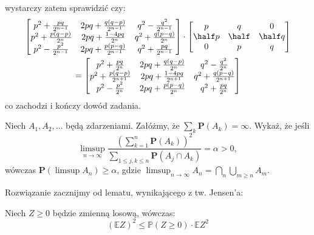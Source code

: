 \documentclass[11pt]{scrartcl}
\begin{document}
    wystarczy zatem sprawidzić czy:
    \begin{gather*}
        \begin{bmatrix}
                p^2 + \frac{pq}{2^{n-1}} & 2pq + \frac{q(q-p)}{2^{n-1}} & q^2 - \frac{q^2}{2^{n-1}} \\
                p^2 + \frac{p(q-p)}{2^n} & 2pq + \frac{1 - 4pq}{2^n} & q^2 + \frac{q(p-q)}{2^n} \\
                p^2 - \frac{p^2}{2^{n-1}} & 2pq + \frac{p(p - q)}{2^{n-1}} & q^2 + \frac{pq}{2^{n-1}}
        \end{bmatrix}
        \cdot 
        \begin{bmatrix}
            p       & q     & 0       \\
            \half p & \half & \half q \\
            0       & p     & q
        \end{bmatrix} \\
        =
        \begin{bmatrix}
                p^2 + \frac{pq}{2^{n}} & 2pq + \frac{q(q-p)}{2^{n}} & q^2 - \frac{q^2}{2^{n}} \\
                p^2 + \frac{p(q-p)}{2^{n+1}} & 2pq + \frac{1 - 4pq}{2^{n+1}} & q^2 + \frac{q(p-q)}{2^{n+1}} \\
                p^2 - \frac{p^2}{2^{n}} & 2pq + \frac{p(p - q)}{2^{n}} & q^2 + \frac{pq}{2^{n}}
        \end{bmatrix}
    \end{gather*}
    co zachodzi i kończy dowód zadania.

    \vspace{2cm}

    \begin{zadanie*}
        Niech \( A_1, A_2, \dots \) będą zdarzeniami. 
        Załóżmy, że \( \sum_k \mathbf{P}(A_k) = \infty \). Wykaż, że jeśli
        \[
            \limsup_{n \to \infty} 
                \frac{\left( \sum_{k=1}^{n} \mathbf{P}(A_k) \right)^2}
                {\sum_{1 \leq j, k \leq n} \mathbf{P}(A_j \cap A_k)} 
                = \alpha > 0,
        \]
        wówczas \( \mathbf{P} (\limsup A_n) \geq \alpha \), 
        gdzie \( \limsup_{n \to \infty} A_n = \bigcap_n \bigcup_{m \geq n} A_m \).
    \end{zadanie*}

    Rozwiązanie zacznijmy od lematu, wynikającego z tw. Jensen'a:
    \begin{lemat}
        \label{lem:cauchy}
        Niech $Z \geq 0$ będzie zmienną losową, wówczas:
        \[
            \left ( \mathbb{E} Z \right )^2 \leq \mathbb{P} (Z \geq 0) \cdot \mathbb{E} Z^2 
        \]
    \end{lemat}
\end{document}
